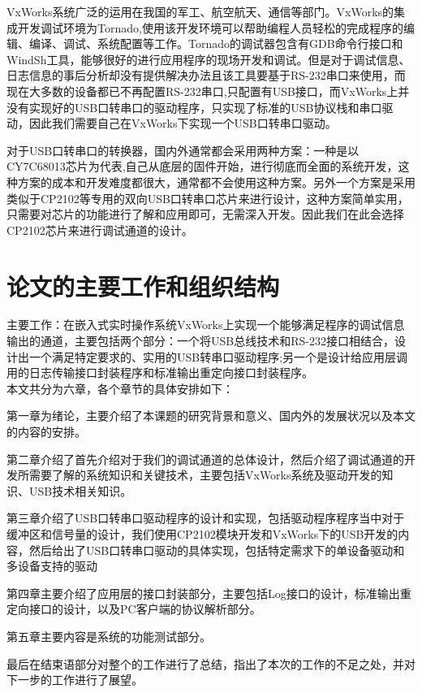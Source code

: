 	VxWorks系统广泛的运用在我国的军工、航空航天、通信等部门\cite{陈洋2007VxWorks}\cite{张鹏2007基于}。VxWorks的集成开发调试环境为Tornado,使用该开发环境可以帮助编程人员轻松的完成程序的编辑、编译、调试、系统配置等工作\cite{嵌入式实时操作系统VxWorks及其开发环境Tornado}\cite{Tronado}。Tornado的调试器包含有GDB命令行接口和WindSh工具，能够很好的进行应用程序的现场开发和调试。但是对于调试信息、日志信息的事后分析却没有提供解决办法且该工具要基于RS-232串口来使用，而现在大多数的设备都已不再配置RS-232串口,只配置有USB接口，而VxWorks上并没有实现好的USB口转串口的驱动程序，只实现了标准的USB协议栈和串口驱动，因此我们需要自己在VxWorks下实现一个USB口转串口驱动。
	
	对于USB口转串口的转换器，国内外通常都会采用两种方案：一种是以CY7C68013芯片为代表,自己从底层的固件开始，进行彻底而全面的系统开发，这种方案的成本和开发难度都很大，通常都不会使用这种方案。另外一个方案是采用类似于CP2102等专用的双向USB口转串口芯片来进行设计，这种方案简单实用，只需要对芯片的功能进行了解和应用即可，无需深入开发\cite{Yao2009Design}\cite{Zhou2002The}。因此我们在此会选择CP2102芯片来进行调试通道的设计。	
	
	

\section{论文的主要工作和组织结构}	
	主要工作：在嵌入式实时操作系统VxWorks上实现一个能够满足程序的调试信息输出的通道，主要包括两个部分：一个将USB总线技术和RS-232接口相结合，设计出一个满足特定要求的、实用的USB转串口驱动程序;另一个是设计给应用层调用的日志传输接口封装程序和标准输出重定向接口封装程序。\\
 本文共分为六章，各个章节的具体安排如下：
 
 第一章为绪论，主要介绍了本课题的研究背景和意义、国内外的发展状况以及本文的内容的安排。
 
 第二章介绍了首先介绍对于我们的调试通道的总体设计，然后介绍了调试通道的开发所需要了解的系统知识和关键技术，主要包括VxWorks系统及驱动开发的知识、USB技术相关知识。
 
 第三章介绍了USB口转串口驱动程序的设计和实现，包括驱动程序程序当中对于缓冲区和信号量的设计，我们使用CP2102模块开发和VxWorks下的USB开发的内容，然后给出了USB口转串口驱动的具体实现，包括特定需求下的单设备驱动和多设备支持的驱动
 
 第四章主要介绍了应用层的接口封装部分，主要包括Log接口的设计，标准输出重定向接口的设计，以及PC客户端的协议解析部分。
 
 第五章主要内容是系统的功能测试部分。
 
 最后在结束语部分对整个的工作进行了总结，指出了本次的工作的不足之处，并对下一步的工作进行了展望。 

